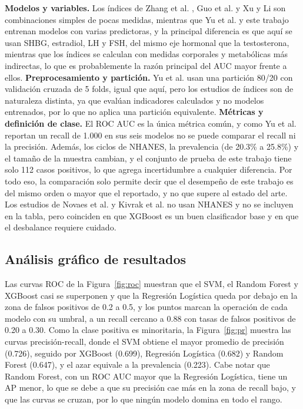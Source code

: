 \documentclass[conference]{IEEEtran}
\begin{document}
\textbf{Modelos y variables.} Los índices de Zhang et al. \cite{zhang2025}, Guo et al. \cite{guo2025} y Xu y Li \cite{xu2024} son combinaciones simples de pocas medidas, mientras que Yu et al. \cite{yu2025} y este trabajo entrenan modelos con varias predictoras, y la principal diferencia es que aquí se usan SHBG, estradiol, LH y FSH, del mismo eje hormonal que la testosterona, mientras que los índices se calculan con medidas corporales y metabólicas más indirectas, lo que es probablemente la razón principal del AUC mayor frente a ellos. \textbf{Preprocesamiento y partición.} Yu et al. \cite{yu2025} usan una partición 80/20 con validación cruzada de 5 folds, igual que aquí, pero los estudios de índices son de naturaleza distinta, ya que evalúan indicadores calculados y no modelos entrenados, por lo que no aplica una partición equivalente. \textbf{Métricas y definición de clase.} El ROC AUC es la única métrica común, y como Yu et al. \cite{yu2025} reportan un recall de 1.000 en sus seis modelos no se puede comparar el recall ni la precisión. Además, los ciclos de NHANES, la prevalencia (de 20.3\% a 25.8\%) y el tamaño de la muestra cambian, y el conjunto de prueba de este trabajo tiene solo 112 casos positivos, lo que agrega incertidumbre a cualquier diferencia. Por todo eso, la comparación solo permite decir que el desempeño de este trabajo es del mismo orden o mayor que el reportado, y no que supere al estado del arte. Los estudios de Novaes et al. \cite{novaes2021} y Kivrak et al. \cite{kivrak2024} no usan NHANES y no se incluyen en la tabla, pero coinciden en que XGBoost es un buen clasificador base y en que el desbalance requiere cuidado.

\subsection{Análisis gráfico de resultados}

Las curvas ROC de la Figura~\ref{fig:roc} muestran que el SVM, el Random Forest y XGBoost casi se superponen y que la Regresión Logística queda por debajo en la zona de falsos positivos de 0.2 a 0.5, y los puntos marcan la operación de cada modelo con su umbral, a un recall cercano a 0.88 con tasas de falsos positivos de 0.20 a 0.30. Como la clase positiva es minoritaria, la Figura~\ref{fig:pr} muestra las curvas precisión-recall, donde el SVM obtiene el mayor promedio de precisión (0.726), seguido por XGBoost (0.699), Regresión Logística (0.682) y Random Forest (0.647), y el azar equivale a la prevalencia (0.223). Cabe notar que Random Forest, con un ROC AUC mayor que la Regresión Logística, tiene un AP menor, lo que se debe a que su precisión cae más en la zona de recall bajo, y que las curvas se cruzan, por lo que ningún modelo domina en todo el rango.
\end{document}
